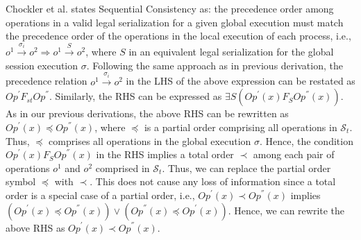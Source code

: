 \documentclass[journal,compsoc]{IEEEtran}
\begin{document}
   \par Chockler et al. states Sequential Consistency as: the precedence order among operations  in a valid legal serialization for a given global execution must match the precedence order of the operations in the local execution of each process, i.e.,  $\mathit{o}^1 \xrightarrow{\sigma_i} \mathit{o}^2 \Rightarrow \mathit{o}^1 \xrightarrow{S} \mathit{o}^2$, where $S$ in an equivalent legal serialization for the global session execution $\sigma$.  Following the same approach as in previous derivation, %
  the precedence relation $\mathit{o}^1 \xrightarrow{\sigma_i} \mathit{o}^2$ in the LHS of the above expression can be restated as
   $\mathit{Op}^{'} F_\mathit{st}  \mathit{Op}^{''}$.  %
   Similarly, the RHS can be expressed as $ \exists S \left( \mathit{Op}^{'}(x) F_{S} \mathit{Op}^{''}(x) \right)$. %
  As in our previous derivations, the above RHS can be rewritten as ${\mathit{Op}}^{'}(x)  \preccurlyeq {\mathit{Op}}^{''}(x)$, where $ \preccurlyeq$ is a partial order comprising all operations in $\mathcal{S}_t$. Thus, $ \preccurlyeq$ comprises all operations in the global execution $\sigma$. Hence, the condition ${\mathit{Op}}^{'}(x)  F_{S} {\mathit{Op}}^{''}(x) $ in the RHS implies a total order $\prec$ among each pair of operations $\mathit{o}^1 $ and $\mathit{o}^2$ comprised in $\mathcal{S}_t$. Thus, we can replace the partial order symbol $\preccurlyeq$ with $\prec$. This does not cause any loss of information since a total order is a special case of a partial order, i.e., ${\mathit{Op}}^{'}(x)  \prec {\mathit{Op}}^{''}(x)$  implies $\left( {\mathit{Op}}^{'}(x) \preccurlyeq {\mathit{Op}}^{''}(x) \right) \vee \left( {\mathit{Op}}^{''}(x)  \preccurlyeq {\mathit{Op}}^{'}(x)\right)$. Hence, we can rewrite the above RHS as  ${\mathit{Op}}^{'}(x)  \prec {\mathit{Op}}^{''}(x) $. 
\end{document}
